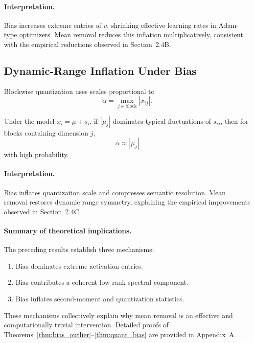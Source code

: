 \paragraph{Interpretation.}
Bias increases extreme entries of $v$, shrinking effective learning rates in
Adam-type optimizers.
Mean removal reduces this inflation multiplicatively, consistent with the
empirical reductions observed in Section~2.4B.

\subsection{Dynamic-Range Inflation Under Bias}
\label{subsec:theory_quant}

Blockwise quantization uses scales proportional to
\[
\alpha = \max_{j \in \text{block}} |x_{ij}|.
\]

\begin{theorem}
\label{thm:quant_bias}
Under the model $x_i=\mu+s_i$,
if $|\mu_j|$ dominates typical fluctuations of $s_{ij}$,
then for blocks containing dimension $j$,
\[
\alpha \approx |\mu_j|
\]
with high probability.
\end{theorem}

\paragraph{Interpretation.}
Bias inflates quantization scale and compresses semantic resolution.
Mean removal restores dynamic range symmetry, explaining the empirical
improvements observed in Section~2.4C.

\paragraph{Summary of theoretical implications.}

The preceding results establish three mechanisms:

\begin{enumerate}
\item Bias dominates extreme activation entries.
\item Bias contributes a coherent low-rank spectral component.
\item Bias inflates second-moment and quantization statistics.
\end{enumerate}

These mechanisms collectively explain why mean removal is an effective
and computationally trivial intervention.
Detailed proofs of Theorems~\ref{thm:bias_outlier}--\ref{thm:quant_bias}
are provided in Appendix~A.

